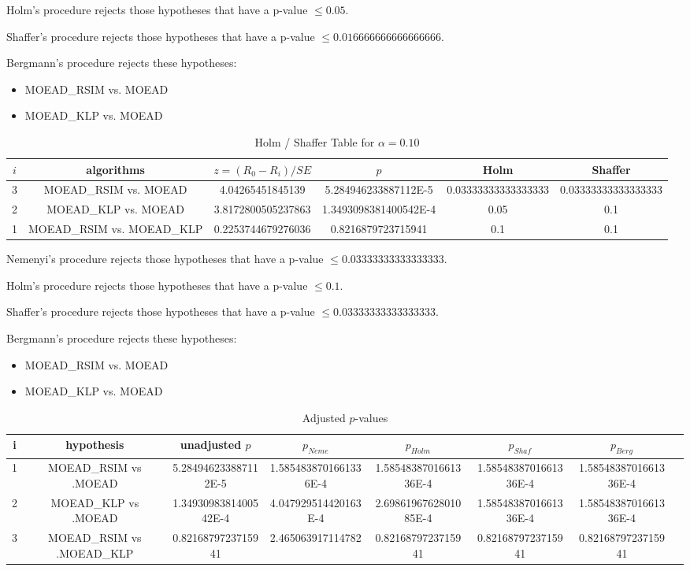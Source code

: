 \documentclass[a4paper,10pt]{article}
\begin{document}
\begin{landscape}
Holm's procedure rejects those hypotheses that have a p-value $\le0.05$.


Shaffer's procedure rejects those hypotheses that have a p-value $\le0.016666666666666666$.


Bergmann's procedure rejects these hypotheses:


\begin{itemize}


\item MOEAD_RSIM vs. MOEAD
\item MOEAD_KLP vs. MOEAD
\end{itemize}


\begin{table}[!htp]
\centering\tiny
\caption{Holm / Shaffer Table for $\alpha=0.10$}
\begin{tabular}{cccccc}
$i$&algorithms&$z=(R_0 - R_i)/SE$&$p$&Holm&Shaffer\\
\hline
3&MOEAD_RSIM vs. MOEAD&4.04265451845139&5.284946233887112E-5&0.03333333333333333&0.03333333333333333\\
2&MOEAD_KLP vs. MOEAD&3.8172800505237863&1.3493098381400542E-4&0.05&0.1\\
1&MOEAD_RSIM vs. MOEAD_KLP&0.2253744679276036&0.8216879723715941&0.1&0.1\\
\hline
\end{tabular}
\end{table}
Nemenyi's procedure rejects those hypotheses that have a p-value $\le0.03333333333333333$.


Holm's procedure rejects those hypotheses that have a p-value $\le0.1$.


Shaffer's procedure rejects those hypotheses that have a p-value $\le0.03333333333333333$.


Bergmann's procedure rejects these hypotheses:


\begin{itemize}


\item MOEAD_RSIM vs. MOEAD
\item MOEAD_KLP vs. MOEAD
\end{itemize}


\begin{table}[!htp]
\centering\tiny
\caption{Adjusted $p$-values}
\begin{tabular}{cccccccc}
i&hypothesis&unadjusted $p$&$p_{Neme}$&$p_{Holm}$&$p_{Shaf}$&$p_{Berg}$\\
\hline
1&MOEAD_RSIM vs .MOEAD&5.284946233887112E-5&1.5854838701661336E-4&1.5854838701661336E-4&1.5854838701661336E-4&1.5854838701661336E-4\\
2&MOEAD_KLP vs .MOEAD&1.3493098381400542E-4&4.047929514420163E-4&2.6986196762801085E-4&1.5854838701661336E-4&1.5854838701661336E-4\\
3&MOEAD_RSIM vs .MOEAD_KLP&0.8216879723715941&2.465063917114782&0.8216879723715941&0.8216879723715941&0.8216879723715941\\
\hline
\end{tabular}
\end{table}

\end{landscape}
\end{document}
